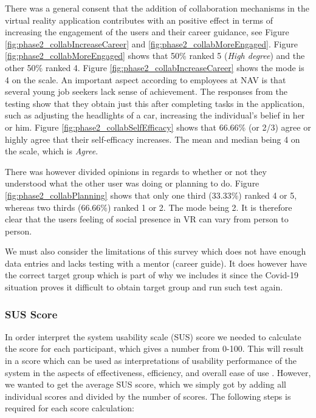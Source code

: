 There was a general consent that the addition of collaboration mechanisms in the virtual reality application contributes with an positive effect in terms of increasing the engagement of the users and their career guidance, see Figure \ref{fig:phase2_collabIncreaseCareer} and \ref{fig:phase2_collabMoreEngaged}. Figure \ref{fig:phase2_collabMoreEngaged} shows that 50\% ranked 5 (\textit{High degree}) and the other 50\% ranked 4. Figure \ref{fig:phase2_collabIncreaseCareer}  shows the mode is 4 on the scale. 
An important aspect according to employees at NAV is that several young job seekers lack sense of achievement. The responses from the testing show that they obtain just this after completing tasks in the application, such as adjusting the headlights of a car, increasing the individual's belief in her or him. Figure \ref{fig:phase2_collabSelfEfficacy} shows that 66.66\% (or 2/3) agree or highly agree that their self-efficacy increases. The mean and median being 4 on the scale, which is \textit{Agree}. 

There was however divided opinions in regards to whether or not they understood what the other user was doing or planning to do. Figure \ref{fig:phase2_collabPlanning} shows that only one third (33.33\%) ranked 4 or 5, whereas two thirds (66.66\%) ranked 1 or 2. The mode being 2. It is therefore clear that the users feeling of social presence in VR can vary from person to person. 

We must also consider the limitations of this survey which does not have enough data entries and lacks testing with a mentor (career guide). It does however have the correct target group which is part of why we includes it since the Covid-19 situation proves it difficult to obtain target group and run such test again.


\subsubsection{SUS Score}
\label{section:phase2SUS}
In order interpret the system usability scale (SUS) score we needed to calculate the score for each participant, which gives a number from 0-100. This will result in a score which can be used as interpretations of usability performance of the system in the aspects of effectiveness, efficiency, and overall ease of use \cite{SusMeasuringInterpret}. However, we wanted to get the average SUS score, which we simply got by adding all individual scores and divided by the number of scores. The following steps is required for each score calculation: 


